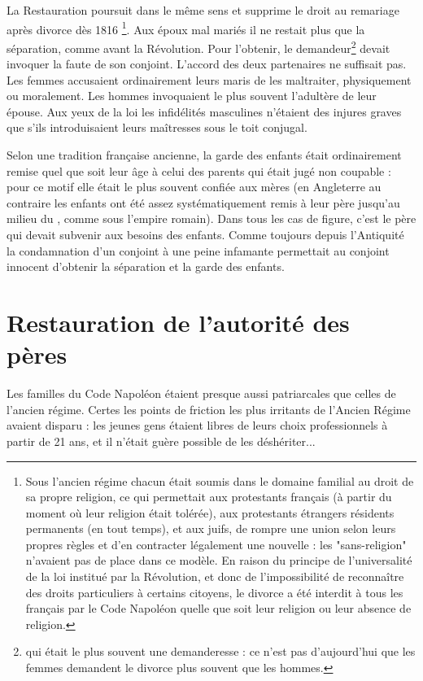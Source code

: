  La Restauration poursuit dans le même sens et supprime le droit au remariage après divorce dès 1816
\footnote{Sous l'ancien régime chacun était soumis dans le domaine familial au droit de sa propre religion, ce qui permettait aux protestants français (à partir du moment où leur religion était tolérée), aux protestants étrangers résidents permanents (en tout temps), et aux juifs, de rompre une union selon leurs propres règles et d'en contracter légalement une nouvelle : les "sans-religion" n'avaient pas de place dans ce modèle. En raison du principe de l'universalité de la loi institué par la Révolution, et donc de l'impossibilité de reconnaître des droits particuliers à certains citoyens, le divorce a été interdit à tous les français par le Code Napoléon quelle que soit leur religion ou leur absence de religion.}. Aux époux mal mariés il ne restait plus que la séparation, comme avant la Révolution. Pour l'obtenir, le demandeur\footnote{qui était le plus souvent une demanderesse : ce n'est pas d'aujourd'hui que les femmes demandent le divorce plus souvent que les hommes.} devait invoquer la faute de son conjoint. L'accord des deux partenaires ne suffisait pas. Les femmes accusaient ordinairement leurs maris de les maltraiter, physiquement ou moralement. Les hommes invoquaient le plus souvent l'adultère de leur épouse. Aux yeux de la loi les infidélités masculines n'étaient des injures graves que s'ils introduisaient leurs maîtresses sous le toit conjugal. 

 Selon une tradition française ancienne, la garde des enfants était ordinairement remise quel que soit leur âge à celui des parents qui était jugé non coupable : pour ce motif elle était le plus souvent confiée aux mères (en Angleterre au contraire les enfants ont été assez systématiquement remis à leur père jusqu'au milieu du , comme sous l'empire romain). Dans tous les cas de figure, c'est le père qui devait subvenir aux besoins des enfants. Comme toujours depuis l'Antiquité la condamnation d'un conjoint à une peine infamante permettait au conjoint innocent d'obtenir la séparation et la garde des enfants.

\section{Restauration de l'autorité des pères}

 Les familles du Code Napoléon étaient presque aussi patriarcales que celles de l'ancien régime. Certes les points de friction les plus irritants de l'Ancien Régime avaient disparu : les jeunes gens étaient libres de leurs choix professionnels à partir de 21 ans, et il n'était guère possible de les déshériter... 
 
